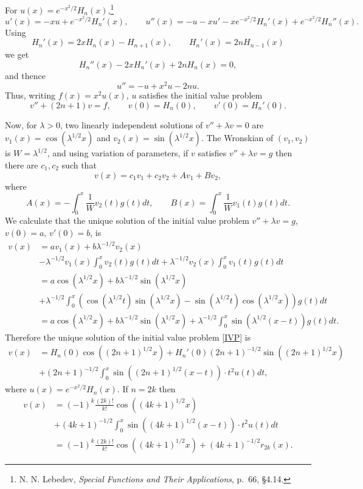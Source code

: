 \documentclass{article}
\theoremstyle{definition}
\begin{document}
For $u(x) = e^{-x^2/2} H_n(x)$,\footnote{N. N. Lebedev, {\em Special Functions and Their Applications},
p.~66, \S 4.14.}
\[
u'(x) = -xu +e^{-x^2/2} H_n'(x),\qquad u''(x) = -u-xu'-xe^{-x^2/2} H_n'(x)+e^{-x^2/2} H_n''(x).
\]
Using
\[
H_n'(x)=2xH_n(x)-H_{n+1}(x),\qquad H_n'(x)=2nH_{n-1}(x)
\]
we get
\[
H_n''(x)  - 2xH_n'(x) + 2nH_n(x) = 0,
\]
and thence
\[
u''= -u+x^2 u - 2nu.
\]
Thus, writing $f(x)=x^2 u(x)$, $u$ satisfies the initial value problem
\begin{equation}
v'' + (2n+1) v = f,\qquad v(0)=H_n(0),\qquad v'(0)=H_n'(0).
\label{IVP}
\end{equation}

Now, for $\lambda>0$, two linearly independent solutions of
$v'' + \lambda v = 0$
are $v_1(x) =\cos(\lambda^{1/2} x)$ and $v_2(x) = \sin(\lambda^{1/2}x)$. 
The Wronskian of $(v_1,v_2)$ is $W=\lambda^{1/2}$, and using variation of parameters, 
if $v$ satisfies $v''+\lambda v = g$ then
there are $c_1,c_2$ such that 
\[
v(x) = c_1v_1 + c_2v_2 + Av_1 + Bv_2,
\]
where
\[
A(x) = -\int_0^x \frac{1}{W} v_2(t) g(t) dt,\qquad B(x) = \int_0^x \frac{1}{W} v_1(t) g(t) dt.
\]
We calculate that the unique solution 
of the initial value problem $v''+\lambda v = g$, $v(0)=a$, $v'(0)=b$, is
\begin{align*}
v(x)& =  a v_1(x) +b \lambda^{-1/2} v_2(x)\\
&- \lambda^{-1/2} v_1(x) \int_0^x v_2(t) g(t) dt
+ \lambda^{-1/2} v_2(x) \int_0^x v_1(t) g(t) dt\\
&=a\cos(\lambda^{1/2} x) + b\lambda^{-1/2} \sin(\lambda^{1/2}x)\\
&+
\lambda^{-1/2} \int_0^x ( \cos(\lambda^{1/2} t) \sin(\lambda^{1/2} x) 
-\sin(\lambda^{1/2} t)\cos(\lambda^{1/2} x)) g(t) dt\\
&=a\cos(\lambda^{1/2} x) + b\lambda^{-1/2} \sin(\lambda^{1/2}x)+\lambda^{-1/2} \int_0^x \sin(\lambda^{1/2}(x-t)) g(t) dt.
\end{align*}
Therefore the unique solution of the initial value problem \eqref{IVP} is 
\begin{align*}
v(x) &= H_n(0) \cos((2n+1)^{1/2} x)+H_n'(0) (2n+1)^{-1/2} \sin((2n+1)^{1/2} x) \\
&+ (2n+1)^{-1/2} \int_0^x \sin((2n+1)^{1/2}(x-t)) \cdot t^2 u(t) dt,
\end{align*}
where $u(x) = e^{-x^2/2} H_n(x)$. 
If $n=2k$ then
\begin{align*}
v(x) &= (-1)^k \frac{(2k)!}{k!} \cos((4k+1)^{1/2}x)\\
&+(4k+1)^{-1/2} \int_0^x \sin((4k+1)^{1/2}(x-t))\cdot t^2 u(t) dt\\
&= (-1)^k \frac{(2k)!}{k!} \cos((4k+1)^{1/2}x) +(4k+1)^{-1/2}r_{2k}(x).
\end{align*}
\end{document}
